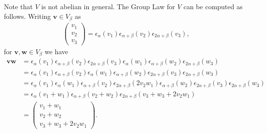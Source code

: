 Note that $V$ is not abelian in general. The Group Law for $V$ can be computed as follows. Writing $\mathbf{v}\in V_\beta$ as
\begin{align*}
	\left(\begin{matrix} v_1\\v_2\\v_3\end{matrix}\right) = \epsilon_\alpha(v_1)\epsilon_{\alpha+\beta}(v_2)\epsilon_{2\alpha+\beta}(v_3),
\end{align*}
for $\mathbf{v}, \mathbf{w}\in V_\beta$ we have
\begin{align*}
\mathbf{v}\mathbf{w}
&= 
\epsilon_\alpha(v_1)\epsilon_{\alpha+\beta}(v_2)\epsilon_{2\alpha+\beta}(v_3) \epsilon_\alpha(w_1)\epsilon_{\alpha+\beta}(w_2)\epsilon_{2\alpha+\beta}(w_3)\\
&= 
\epsilon_\alpha(v_1)\epsilon_{\alpha+\beta}(v_2) \epsilon_\alpha(w_1)\epsilon_{\alpha+\beta}(w_2)\epsilon_{2\alpha+\beta}(v_3)\epsilon_{2\alpha+\beta}(w_3)\\
&= 
\epsilon_\alpha(v_1) \epsilon_\alpha(w_1) \epsilon_{\alpha + \beta}(v_2)\epsilon_{2\alpha+\beta}(2v_2w_1)\epsilon_{\alpha+\beta}(w_2)\epsilon_{2\alpha+\beta}(v_3)\epsilon_{2\alpha+\beta}(w_3)\\
&= 
\epsilon_\alpha(v_1 + w_1) \epsilon_{\alpha + \beta}(v_2 + w_2)\epsilon_{2\alpha+\beta}(v_3 + w_3 + 2v_2w_1)\\
&=
\left(\begin{matrix}
v_1 + w_1 \\
v_2 + w_2 \\
v_3 + w_3 + 2v_2w_1
\end{matrix}\right).
\end{align*}

